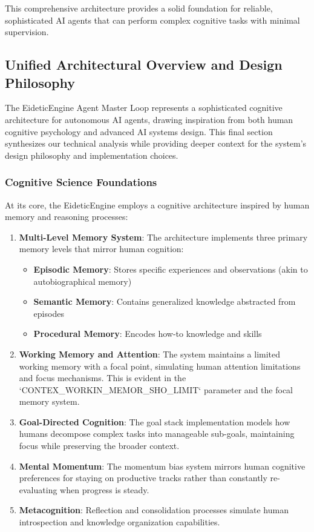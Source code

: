 \documentclass[12pt,a4paper]{article}
\begin{document}
This comprehensive architecture provides a solid foundation for reliable, sophisticated AI agents that can perform complex cognitive tasks with minimal supervision.

\subsection*{Unified Architectural Overview and Design Philosophy}

The EideticEngine Agent Master Loop represents a sophisticated cognitive architecture for autonomous AI agents, drawing inspiration from both human cognitive psychology and advanced AI systems design. This final section synthesizes our technical analysis while providing deeper context for the system's design philosophy and implementation choices.

\subsubsection*{Cognitive Science Foundations}

At its core, the EideticEngine employs a cognitive architecture inspired by human memory and reasoning processes:

\begin{enumerate}[label=\arabic*.]
    \item \textbf{Multi-Level Memory System}: The architecture implements three primary memory levels that mirror human cognition:
    \begin{itemize}
        \item \textbf{Episodic Memory}: Stores specific experiences and observations (akin to autobiographical memory)
        \item \textbf{Semantic Memory}: Contains generalized knowledge abstracted from episodes
        \item \textbf{Procedural Memory}: Encodes how-to knowledge and skills
    \end{itemize}
    \item \textbf{Working Memory and Attention}: The system maintains a limited working memory with a focal point, simulating human attention limitations and focus mechanisms. This is evident in the `CONTEX\1\_WORKIN\1\_MEMOR\1\_SHO\1\_LIMIT` parameter and the focal memory system.
    \item \textbf{Goal-Directed Cognition}: The goal stack implementation models how humans decompose complex tasks into manageable sub-goals, maintaining focus while preserving the broader context.
    \item \textbf{Mental Momentum}: The momentum bias system mirrors human cognitive preferences for staying on productive tracks rather than constantly re-evaluating when progress is steady.
    \item \textbf{Metacognition}: Reflection and consolidation processes simulate human introspection and knowledge organization capabilities.
\end{enumerate}
\end{document}
